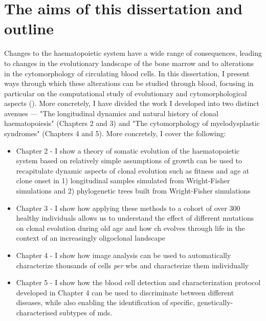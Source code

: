 \section{The aims of this dissertation and outline}

Changes to the haematopoietic system have a wide range of consequences, leading to changes in the evolutionary landscape of the bone marrow and to alterations in the cytomorphology of circulating blood cells. In this dissertation, I present ways through which these alterations can be studied through blood, focusing in particular on the computational study of evolutionary and cytomorphological aspects (). More concretely, I have divided the work I developed into two distinct avenues --- "The longitudinal dynamics and natural history of clonal haematopoiesis" (Chapters 2 and 3) and "The cytomorphology of myelodysplastic syndromes" (Chapters 4 and 5). More concretely, I cover the following:

\begin{itemize}
	\item Chapter 2 - I show a theory of somatic evolution of the haematopoietic system based on relatively simple assumptions of growth can be used to recapitulate dynamic aspects of clonal evolution such as fitness and age at clone onset in 1) longitudinal samples simulated from Wright-Fisher simulations and 2) phylogenetic trees built from Wright-Fisher simulations
	\item Chapter 3 - I show how applying these methods to a cohort of over 300 healthy individuals allows us to understand the effect of different mutations on clonal evolution during old age and how \ac{ch} evolves through life in the context of an increasingly oligoclonal landscape
	\item Chapter 4 - I show how image analysis can be used to automatically characterize thousands of cells \textit{per} \ac{wbs} and characterize them individually
	\item Chapter 5 - I show how the blood cell detection and characterization protocol developed in Chapter 4 can be used to discriminate between different diseases, while also enabling the identification of specific, genetically-characterised subtypes of \ac{mds}.
\end{itemize}

\begin{figure}[!hb]
  \label{fig:overview}
\end{figure}
